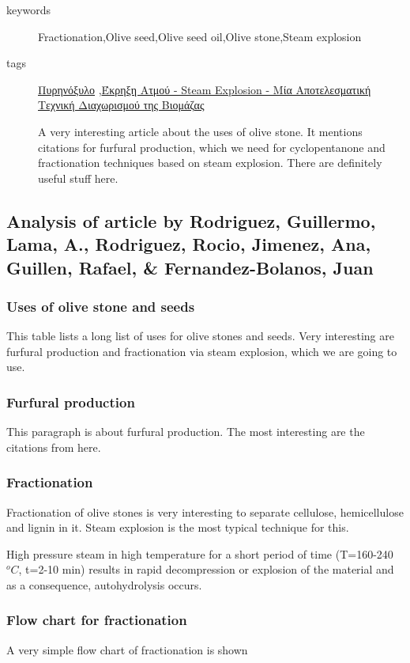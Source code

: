 \documentclass[11pt]{article}
\begin{document}
\begin{description}
\item[{keywords}] Fractionation,Olive seed,Olive seed oil,Olive stone,Steam explosion
\item[{tags}] \href{\detokenize{../../../../org_roam/πυρηνοξυλο-08-11-22.org}}{Πυρηνόξυλο} ,\href{\detokenize{../../../../org_roam/εκρηξη_ατμου_steam_explosion_μια_αποτελεσματικη_τεχνικη_διαχωρισμου_της_βιομαζας-08-11-22.org}}{Έκρηξη Ατμού - Steam Explosion - Μία Αποτελεσματική Τεχνική Διαχωρισμού της Βιομάζας} 

A very interesting article about the uses of olive stone. It mentions citations for furfural production, which we need for cyclopentanone and fractionation techniques based on steam explosion. There are definitely useful stuff here.
\end{description}
\subsection{Analysis of article by Rodriguez, Guillermo, Lama, A., Rodriguez, Rocio, Jimenez, Ana, Guillen, Rafael, \& Fernandez-Bolanos, Juan}
\label{sec:org289b4e9}
\subsubsection{Uses of olive stone and seeds}
\label{sec:org54760f6}
This table lists a long list of uses for olive stones and seeds. Very interesting are furfural production and fractionation via steam explosion, which we are going to use.
\subsubsection{Furfural production}
\label{sec:orgadbe95e}
This paragraph is about furfural production. The most interesting are the citations from here.
\subsubsection{Fractionation}
\label{sec:orgb5f5af8}
Fractionation of olive stones is very interesting to separate cellulose, hemicellulose and lignin in it. Steam explosion is the most typical technique for this.

High pressure steam in high temperature for a short period of time (T=160-240 \(^oC\), t=2-10 min) results in rapid decompression or explosion of the material and as a consequence, autohydrolysis occurs.
\subsubsection{Flow chart for fractionation}
\label{sec:orgfc15b0b}
A very simple flow chart of fractionation is shown
\end{document}
